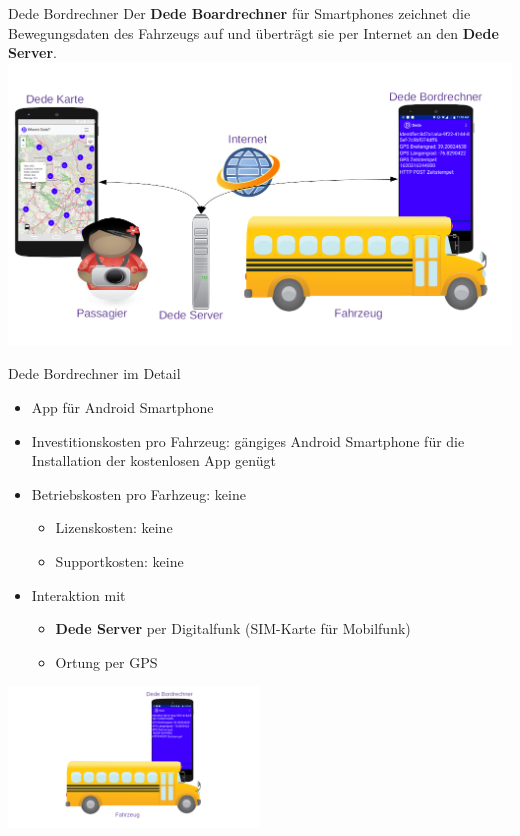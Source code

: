 
\begin{frame}{Dede Bordrechner}
  Der \textbf{Dede Boardrechner} für Smartphones zeichnet die Bewegungsdaten des Fahrzeugs auf und überträgt sie per Internet an den \textbf{Dede Server}.
  \includegraphics[width=\paperwidth]{dede/dede-concept}
\end{frame}

\begin{frame}{Dede Bordrechner im Detail}
  \begin{itemize}
  \item App für Android Smartphone
  \item Investitionskosten pro Fahrzeug: gängiges Android Smartphone für die Installation der kostenlosen App genügt
  \item Betriebskosten pro Farhzeug: keine
    \begin{itemize}
    \item Lizenskosten: keine
    \item Supportkosten: keine
    \end{itemize}
  \item Interaktion mit
    \begin{itemize}
    \item \textbf{Dede Server} per Digitalfunk (SIM-Karte für Mobilfunk)
    \item Ortung per GPS
    \end{itemize}
  \end{itemize}
  \includegraphics[width=0.5\textwidth]{otm-june-2-2021/dede-on-board-computer-june-04.png}
\end{frame}

